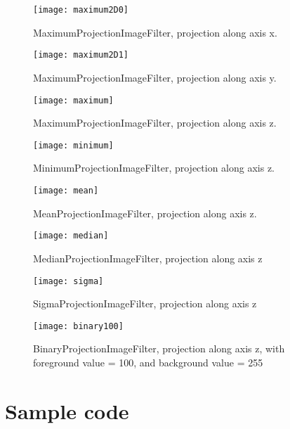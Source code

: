 \documentclass{InsightArticle}
\begin{document}
\begin{figure}[htbp]
\centering
\texttt{[image: maximum2D0]}
\caption{MaximumProjectionImageFilter, projection along axis x.\label{maximum0}}
\end{figure}

\begin{figure}[htbp]
\centering
\texttt{[image: maximum2D1]}
\caption{MaximumProjectionImageFilter, projection along axis y.\label{maximum1}}
\end{figure}

\begin{figure}[htbp]
\centering
\texttt{[image: maximum]}
\caption{MaximumProjectionImageFilter, projection along axis z.\label{maximum}}
\end{figure}

\begin{figure}[htbp]
\centering
\texttt{[image: minimum]}
\caption{MinimumProjectionImageFilter, projection along axis z.\label{minimum}}
\end{figure}

\begin{figure}[htbp]
\centering
\texttt{[image: mean]}
\caption{MeanProjectionImageFilter, projection along axis z.\label{mean}}
\end{figure}

\begin{figure}[htbp]
\centering
\texttt{[image: median]}
\caption{MedianProjectionImageFilter, projection along axis z\label{median}}
\end{figure}

\begin{figure}[htbp]
\centering
\texttt{[image: sigma]}
\caption{SigmaProjectionImageFilter, projection along axis z\label{sigma}}
\end{figure}

\begin{figure}[htbp]
\centering
\texttt{[image: binary100]}
\caption{BinaryProjectionImageFilter, projection along axis z, with foreground value = 100, and background value = 255\label{binary100}}
\end{figure}

\section{Sample code}
\end{document}
